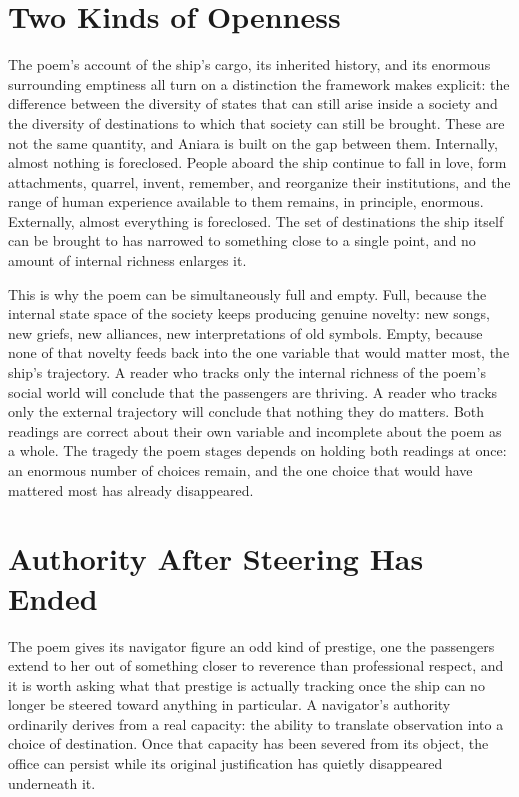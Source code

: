 \documentclass[11pt]{article}
\begin{document}
\section{Two Kinds of Openness}

The poem's account of the ship's cargo, its inherited history, and its enormous surrounding emptiness all turn on a distinction the framework makes explicit: the difference between the diversity of states that can still arise inside a society and the diversity of destinations to which that society can still be brought. These are not the same quantity, and Aniara is built on the gap between them. Internally, almost nothing is foreclosed. People aboard the ship continue to fall in love, form attachments, quarrel, invent, remember, and reorganize their institutions, and the range of human experience available to them remains, in principle, enormous. Externally, almost everything is foreclosed. The set of destinations the ship itself can be brought to has narrowed to something close to a single point, and no amount of internal richness enlarges it.

This is why the poem can be simultaneously full and empty. Full, because the internal state space of the society keeps producing genuine novelty: new songs, new griefs, new alliances, new interpretations of old symbols. Empty, because none of that novelty feeds back into the one variable that would matter most, the ship's trajectory. A reader who tracks only the internal richness of the poem's social world will conclude that the passengers are thriving. A reader who tracks only the external trajectory will conclude that nothing they do matters. Both readings are correct about their own variable and incomplete about the poem as a whole. The tragedy the poem stages depends on holding both readings at once: an enormous number of choices remain, and the one choice that would have mattered most has already disappeared.

\section{Authority After Steering Has Ended}

The poem gives its navigator figure an odd kind of prestige, one the passengers extend to her out of something closer to reverence than professional respect, and it is worth asking what that prestige is actually tracking once the ship can no longer be steered toward anything in particular. A navigator's authority ordinarily derives from a real capacity: the ability to translate observation into a choice of destination. Once that capacity has been severed from its object, the office can persist while its original justification has quietly disappeared underneath it.
\end{document}
